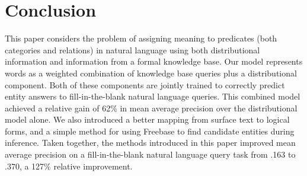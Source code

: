 \documentclass[11pt]{article}
\newcommand{\blank}{\underline{\hspace{.5cm}}}
\newcommand{\predicate}[1]{\ensuremath{\textsc{#1}}}
\begin{document}


\section{Conclusion}
\label{sec:conclusion}

This paper considers the problem of assigning meaning to predicates
(both categories and relations) in natural language using both
distributional information and information from a formal knowledge
base. Our model represents words as a weighted combination of
knowledge base queries plus a distributional component. Both of these
components are jointly trained to correctly predict entity answers to
fill-in-the-blank natural language queries. This combined model
achieved a relative gain of 62\% in mean average precision over the
distributional model alone. We also introduced a better mapping from
surface text to logical forms, and a simple method for using Freebase
to find candidate entities during inference.  Taken together, the
methods introduced in this paper improved mean average precision on a
fill-in-the-blank natural language query task from .163 to .370, a
127\% relative improvement.

\end{document}
